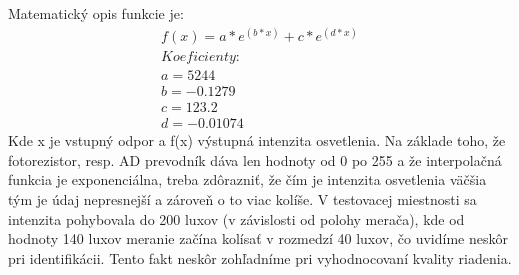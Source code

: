 Matematický opis funkcie je:
\begin{equation} \label{eq42}
\begin{split}
f(x) = a*e^(b*x) + c*e^(d*x) \\
Koeficienty: \\
a =        5244 \\  
b =     -0.1279 \\ 
c =       123.2 \\ 
d =    -0.01074 
\end{split}
\end{equation}
Kde x je vstupný odpor a f(x) výstupná intenzita osvetlenia. Na základe toho, že fotorezistor, resp. AD prevodník dáva len hodnoty od 0 po 255 a že interpolačná funkcia je exponenciálna, treba zdôrazniť, že čím je intenzita osvetlenia väčšia tým je údaj nepresnejší a zároveň o to viac kolíše. V testovacej miestnosti sa intenzita pohybovala do 200 luxov (v závislosti od polohy merača), kde od hodnoty 140 luxov meranie začína kolísať v rozmedzí 40 luxov, čo uvidíme neskôr pri identifikácii. Tento fakt neskôr zohľadníme pri vyhodnocovaní kvality riadenia.

